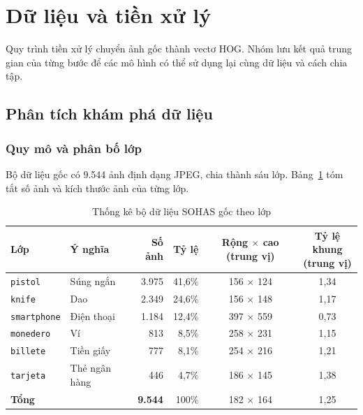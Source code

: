 \section{Dữ liệu và tiền xử lý}
\label{sec:du_lieu}

Quy trình tiền xử lý chuyển ảnh gốc thành vectơ HOG. Nhóm lưu kết quả trung gian của từng bước để các mô hình có thể sử dụng lại cùng dữ liệu và cách chia tập.

\subsection{Phân tích khám phá dữ liệu}

\subsubsection*{Quy mô và phân bố lớp}

Bộ dữ liệu gốc có 9.544 ảnh định dạng JPEG, chia thành sáu lớp. Bảng~\ref{tab:dataset_stats} tóm tắt số ảnh và kích thước ảnh của từng lớp.

\begin{table}[H]
\centering
\caption{Thống kê bộ dữ liệu SOHAS gốc theo lớp}
\label{tab:dataset_stats}
\small
\begin{tabularx}{\linewidth}{@{}lXrrcc@{}}
\toprule
\textbf{Lớp} & \textbf{Ý nghĩa} & \textbf{Số ảnh} & \textbf{Tỷ lệ} &
\shortstack{\textbf{Rộng $\times$ cao}\\\textbf{(trung vị)}} &
\shortstack{\textbf{Tỷ lệ khung}\\\textbf{(trung vị)}} \\
\midrule
\texttt{pistol}     & Súng ngắn       & 3.975 & 41,6\% & 156 $\times$ 124 & 1,34 \\
\texttt{knife}      & Dao             & 2.349 & 24,6\% & 156 $\times$ 148 & 1,17 \\
\texttt{smartphone} & Điện thoại      & 1.184 & 12,4\% & 397 $\times$ 559 & 0,73 \\
\texttt{monedero}   & Ví              &   813 &  8,5\% & 258 $\times$ 231 & 1,15 \\
\texttt{billete}    & Tiền giấy       &   777 &  8,1\% & 254 $\times$ 216 & 1,21 \\
\texttt{tarjeta}    & Thẻ ngân hàng   &   446 &  4,7\% & 186 $\times$ 145 & 1,38 \\
\midrule
\textbf{Tổng}       &                 & \textbf{9.544} & 100\% & 182 $\times$ 164 & 1,25 \\
\bottomrule
\end{tabularx}
\end{table}

